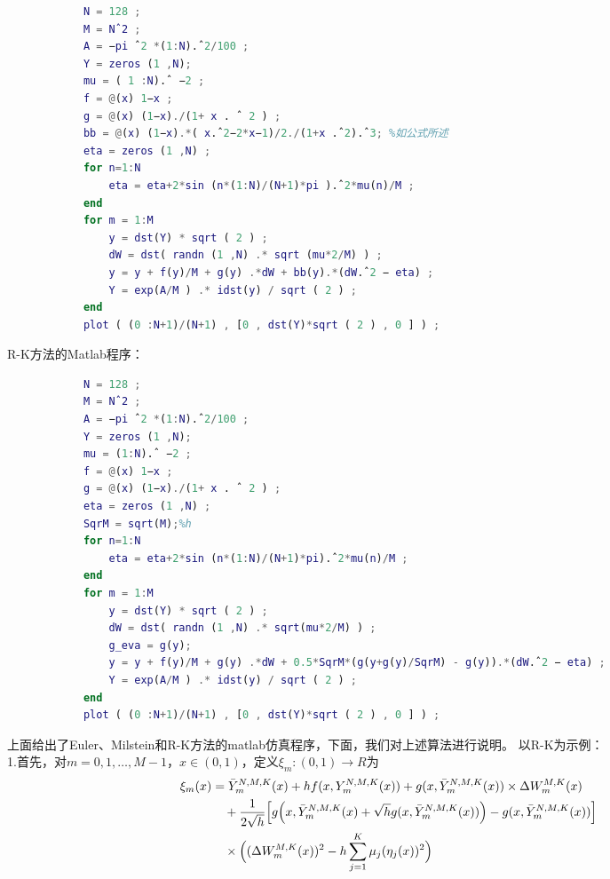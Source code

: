             \begin{lstlisting}[language= Matlab]
            %% 此程序是SPDE的Milstein方法
            N = 128 ;
            M = Nˆ2 ;
            A = −pi ˆ2 *(1:N).ˆ2/100 ;
            Y = zeros (1 ,N);
            mu = ( 1 :N).ˆ −2 ;
            f = @(x) 1−x ;
            g = @(x) (1−x)./(1+ x . ˆ 2 ) ;
            bb = @(x) (1−x).*( x.ˆ2−2*x−1)/2./(1+x .ˆ2).ˆ3; %如公式所述
            eta = zeros (1 ,N) ;
            for n=1:N
                eta = eta+2*sin (n*(1:N)/(N+1)*pi ).ˆ2*mu(n)/M ;
            end
            for m = 1:M
                y = dst(Y) * sqrt ( 2 ) ;
                dW = dst( randn (1 ,N) .* sqrt (mu*2/M) ) ;
                y = y + f(y)/M + g(y) .*dW + bb(y).*(dW.ˆ2 − eta) ;
                Y = exp(A/M ) .* idst(y) / sqrt ( 2 ) ;
            end
            plot ( (0 :N+1)/(N+1) , [0 , dst(Y)*sqrt ( 2 ) , 0 ] ) ;
            \end{lstlisting}
            R-K方法的Matlab程序：
            \begin{lstlisting}[language= Matlab]
            %% 此程序是SPDE的R-K方法
            N = 128 ;
            M = Nˆ2 ;
            A = −pi ˆ2 *(1:N).ˆ2/100 ;
            Y = zeros (1 ,N);
            mu = (1:N).ˆ −2 ;
            f = @(x) 1−x ;
            g = @(x) (1−x)./(1+ x . ˆ 2 ) ;
            eta = zeros (1 ,N) ;
            SqrM = sqrt(M);%h
            for n=1:N
                eta = eta+2*sin (n*(1:N)/(N+1)*pi).ˆ2*mu(n)/M ;
            end
            for m = 1:M
                y = dst(Y) * sqrt ( 2 ) ;
                dW = dst( randn (1 ,N) .* sqrt(mu*2/M) ) ;
                g_eva = g(y);
                y = y + f(y)/M + g(y) .*dW + 0.5*SqrM*(g(y+g(y)/SqrM) - g(y)).*(dW.ˆ2 − eta) ;
                Y = exp(A/M ) .* idst(y) / sqrt ( 2 ) ;
            end
            plot ( (0 :N+1)/(N+1) , [0 , dst(Y)*sqrt ( 2 ) , 0 ] ) ;
            \end{lstlisting}
            \par
            上面给出了Euler、Milstein和R-K方法的matlab仿真程序，下面，我们对上述算法进行说明。
            以R-K为示例：\\
            1.首先，对$m = 0,1,\dots,M-1$，$x\in (0,1)$，定义$\xi_m:(0,1)\rightarrow R$为
            \begin{align*}
                \xi_m(x) &= \bar{Y}_m^{N,M,K}(x) + hf(x,Y_m^{N,M,K}(x)) + g(x,\bar{Y}_m^{N,M,K}(x)) \times \Delta W_m^{M,K}(x)\\
                &\quad +\frac {1}{2\sqrt{h}} \Bigl[ g\Bigl(x,\bar{Y}_m^{N,M,K}(x)+ \sqrt{h} g(x,\bar{Y}_m^{N,M,K}(x)) \Bigr) - g(x,\bar{Y}_m^{N,M,K}(x))\Bigr] \\
                &\quad \times \Bigl((\Delta W_m^{M,K}(x))^2 - h\sum_{j = 1}^K
                \mu_j (\eta_j(x))^2\Bigr)
            \end{align*}
